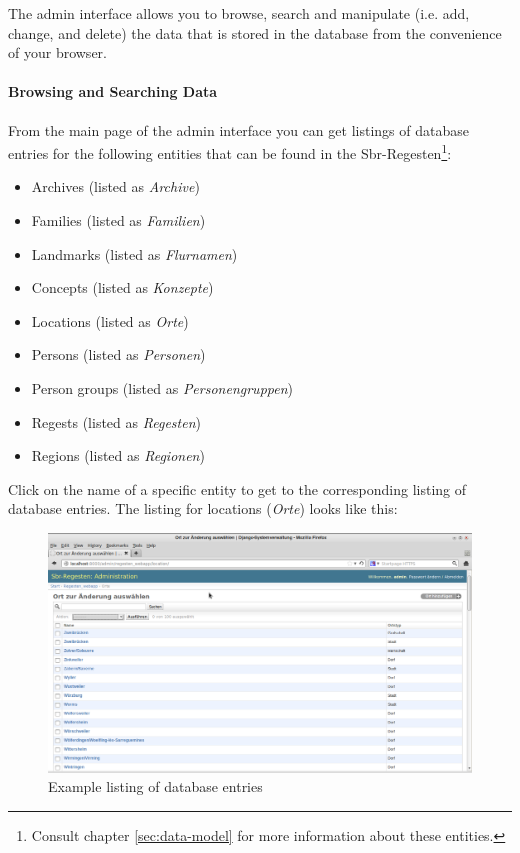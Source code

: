 The admin interface allows you to browse, search and manipulate (i.e.
add, change, and delete) the data that is stored in the database from
the convenience of your browser.

\paragraph{Browsing and Searching Data}
From the main page of the admin interface you can get listings of
database entries for the following entities that can be found in the
Sbr-Regesten\footnote{Consult chapter \ref{sec:data-model} for more
  information about these entities.}:

\begin{itemize}
\item Archives (listed as \emph{Archive})
\item Families (listed as \emph{Familien})
\item Landmarks (listed as \emph{Flurnamen})
\item Concepts (listed as \emph{Konzepte})
\item Locations (listed as \emph{Orte})
\item Persons (listed as \emph{Personen})
\item Person groups (listed as \emph{Personengruppen})
\item Regests (listed as \emph{Regesten})
\item Regions (listed as \emph{Regionen})
\end{itemize}

Click on the name of a specific entity to get to the corresponding
listing of database entries. The listing for locations (\emph{Orte})
looks like this:

\begin{figure}[h]
  \centering
  \includegraphics[scale=0.3]{img/admin-loc-listing}
  \caption{Example listing of database entries}
  \label{fig:admin-loc-listing}
\end{figure}

